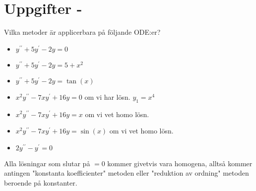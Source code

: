 \section{Uppgifter - }

\noindent Vilka metoder är applicerbara på följande ODE:er?

\begin{itemize}
  \item $y^{\prime\prime}+5y^{\prime}-2y = 0$\\
  \item $y^{\prime\prime}+5y^{\prime} -2y = 5+x^2$\\
  \item $y^{\prime\prime}+5y^{\prime}-2y = \tan(x)$\\
  \item $x^2y^{\prime\prime}-7xy^{\prime}+16y=0$ om vi har lösn. $y_1 = x^4$\\
  \item $x^2y^{\prime\prime}-7xy^{\prime}+16y=x$ om vi vet homo lösn.\\
  \item $x^2y^{\prime\prime}-7xy^{\prime}+16y=\sin(x)$ om vi vet homo lösn. \\
  \item $2y^{\prime\prime}-y^{\prime}=0$
\end{itemize}

Alla lösningar som slutar på $=0$ kommer givetvis vara homogena, alltså kommer antingen "konstanta koefficienter" metoden eller "reduktion av ordning" metoden beroende på konstanter.
